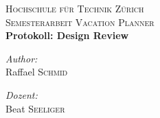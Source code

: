 \begin{titlepage}
 
\begin{center}
 
  
\textsc{\LARGE Hochschule f\"ur Technik Z\"urich}\\[1.5cm]
 
\textsc{\Large Semesterarbeit Vacation Planner}\\[1.5cm]
 { \huge \bfseries Protokoll: Design Review}\\[5cm]
 \begin{minipage}{0.4\textwidth}
\begin{flushleft} \large
\emph{Author:}\\
Raffael \textsc{Schmid}
\end{flushleft}
\end{minipage}
\begin{minipage}{0.4\textwidth}
\begin{flushright} \large
\emph{Dozent:} \\
Beat \textsc{Seeliger}
\end{flushright}
\end{minipage}
\vfill
\end{center}
\end{titlepage}
